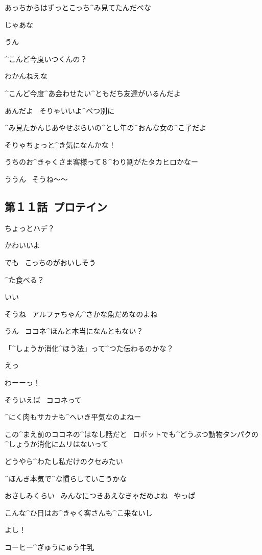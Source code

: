 \Y あっちからはずっとこっち^{み}{見}てたんだべな

\Y じゃあな

\T うん

\T ^{こんど}{今度}いつくんの？

\Y わかんねえな

\page
\T ^{こんど}{今度}^{あ}{会}わせたい^{ともだち}{友達}がいるんだよ

\Y あんだよ
\ そりゃいいよ^{べつ}{別}に

\T ^{み}{見}たかんじあやせぶらいの^{とし}{年}の^{おんな}{女}の^{こ}{子}だよ

\Y そりゃちょっと^{き}{気}になんかな！

\page
\A うちのお^{きゃくさま}{客様}って８^{わり}{割}がたタカヒロかなー

\A ううん
\ そうね〜〜


\subsection{第１１話\ プロテイン}

\page[52]
\A ちょっとハデ？

\K かわいいよ

\page
\K でも
\ こっちのがおいしそう

\K ^{た}{食}べる？

\A いい

\K そうね
\ アルファちゃん^{さかな}{魚}だめなのよね

\A うん
\ ココネ^{ほんと}{本当}になんともない？

\K 「^{しょうか}{消化}^{ほう}{法}」って^{つた}{伝}わるのかな？

\A えっ

\A わーーっ！

\page[55]
\A そういえば
\ ココネって

\A ^{にく}{肉}もサカナも^{へいき}{平気}なのよねー

\A この^{まえ}{前}のココネの^{はなし}{話}だと
\ ロボットでも^{どうぶつ}{動物}タンパクの^{しょうか}{消化}にムリはないって

\A どうやら^{わたし}{私}だけのクセみたい

\page
\A ^{ほんき}{本気}で^{な}{慣}らしていこうかな

\A おさしみくらい
\ みんなにつきあえなきゃだめよね
\ やっぱ

\A こんな^{ひ}{日}はお^{きゃく}{客}さんも^{こ}{来}ないし

\A よし！

\page
\Sign コーヒー^{ぎゅうにゅう}{牛乳}

